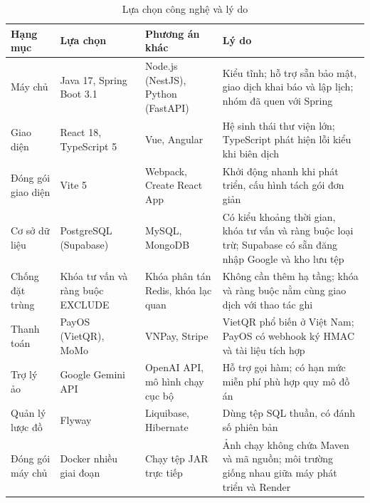\begin{table}[!htbp]
\centering
\caption{Lựa chọn công nghệ và lý do}
\label{tab:lua_chon_congnghe}
\small
\renewcommand{\arraystretch}{1.2}
\begin{tabularx}{\linewidth}{|P{2.4cm}|P{2.8cm}|P{2.8cm}|L|}
\hline
\textbf{Hạng mục} & \textbf{Lựa chọn} & \textbf{Phương án khác} & \textbf{Lý do} \\
\hline
Máy chủ & Java 17, Spring Boot 3.1 & Node.js (NestJS), Python (FastAPI) & Kiểu tĩnh; hỗ trợ sẵn bảo mật, giao dịch khai báo và lập lịch; nhóm đã quen với Spring \\
\hline
Giao diện & React 18, TypeScript 5 & Vue, Angular & Hệ sinh thái thư viện lớn; TypeScript phát hiện lỗi kiểu khi biên dịch \\
\hline
Đóng gói giao diện & Vite 5 & Webpack, Create React App & Khởi động nhanh khi phát triển, cấu hình tách gói đơn giản \\
\hline
Cơ sở dữ liệu & PostgreSQL (Supabase) & MySQL, MongoDB & Có kiểu khoảng thời gian, khóa tư vấn và ràng buộc loại trừ; Supabase có sẵn đăng nhập Google và kho lưu tệp \\
\hline
Chống đặt trùng & Khóa tư vấn và ràng buộc EXCLUDE & Khóa phân tán Redis, khóa lạc quan & Không cần thêm hạ tầng; khóa và ràng buộc nằm cùng giao dịch với thao tác ghi \\
\hline
Thanh toán & PayOS (VietQR), MoMo & VNPay, Stripe & VietQR phổ biến ở Việt Nam; PayOS có webhook ký HMAC và tài liệu tích hợp \\
\hline
Trợ lý ảo & Google Gemini API & OpenAI API, mô hình chạy cục bộ & Hỗ trợ gọi hàm; có hạn mức miễn phí phù hợp quy mô đồ án \\
\hline
Quản lý lược đồ & Flyway & Liquibase, Hibernate  & Dùng tệp SQL thuần, có đánh số phiên bản \\
\hline
Đóng gói máy chủ & Docker nhiều giai đoạn & Chạy tệp JAR trực tiếp & Ảnh chạy không chứa Maven và mã nguồn; môi trường giống nhau giữa máy phát triển và Render \\
\hline
\end{tabularx}
\end{table}
